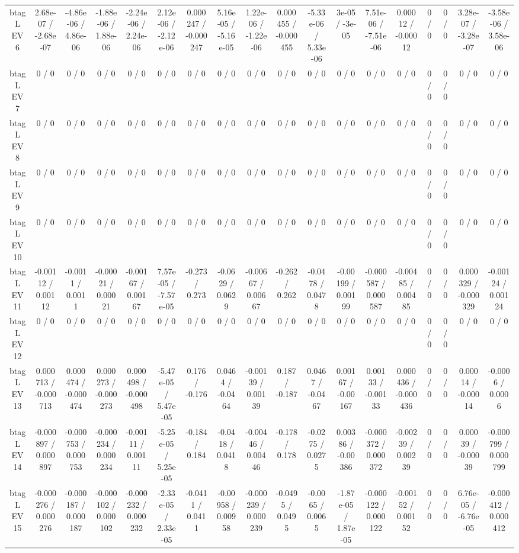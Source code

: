 \documentclass[10pt]{article}
\begin{document}
\begin{table}[htbp]
\begin{center}
\begin{tabular}{|c|c|c|c|c|c|c|c|c|c|c|c|c|c|c|c|c|c|}
  btag L EV 6 & 2.68e-07 / -2.68e-07 & -4.86e-06 / 4.86e-06 & -1.88e-06 / 1.88e-06 & -2.24e-06 / 2.24e-06 & 2.12e-06 / -2.12e-06 & 0.000247 / -0.000247 & 5.16e-05 / -5.16e-05 & 1.22e-06 / -1.22e-06 & 0.000455 / -0.000455 & -5.33e-06 / 5.33e-06 & 3e-05 / -3e-05 & 7.51e-06 / -7.51e-06 & 0.00012 / -0.00012 & 0 / 0 & 0 / 0 & 3.28e-07 / -3.28e-07 & -3.58e-06 / 3.58e-06 \\ 
  btag L EV 7 & 0 / 0 & 0 / 0 & 0 / 0 & 0 / 0 & 0 / 0 & 0 / 0 & 0 / 0 & 0 / 0 & 0 / 0 & 0 / 0 & 0 / 0 & 0 / 0 & 0 / 0 & 0 / 0 & 0 / 0 & 0 / 0 & 0 / 0 \\ 
  btag L EV 8 & 0 / 0 & 0 / 0 & 0 / 0 & 0 / 0 & 0 / 0 & 0 / 0 & 0 / 0 & 0 / 0 & 0 / 0 & 0 / 0 & 0 / 0 & 0 / 0 & 0 / 0 & 0 / 0 & 0 / 0 & 0 / 0 & 0 / 0 \\ 
  btag L EV 9 & 0 / 0 & 0 / 0 & 0 / 0 & 0 / 0 & 0 / 0 & 0 / 0 & 0 / 0 & 0 / 0 & 0 / 0 & 0 / 0 & 0 / 0 & 0 / 0 & 0 / 0 & 0 / 0 & 0 / 0 & 0 / 0 & 0 / 0 \\ 
  btag L EV 10 & 0 / 0 & 0 / 0 & 0 / 0 & 0 / 0 & 0 / 0 & 0 / 0 & 0 / 0 & 0 / 0 & 0 / 0 & 0 / 0 & 0 / 0 & 0 / 0 & 0 / 0 & 0 / 0 & 0 / 0 & 0 / 0 & 0 / 0 \\ 
  btag L EV 11 & -0.00112 / 0.00112 & -0.0011 / 0.0011 & -0.00021 / 0.00021 & -0.00167 / 0.00167 & 7.57e-05 / -7.57e-05 & -0.273 / 0.273 & -0.0629 / 0.0629 & -0.00667 / 0.00667 & -0.262 / 0.262 & -0.0478 / 0.0478 & -0.00199 / 0.00199 & -0.000587 / 0.000587 & -0.00485 / 0.00485 & 0 / 0 & 0 / 0 & 0.000329 / -0.000329 & -0.00124 / 0.00124 \\ 
  btag L EV 12 & 0 / 0 & 0 / 0 & 0 / 0 & 0 / 0 & 0 / 0 & 0 / 0 & 0 / 0 & 0 / 0 & 0 / 0 & 0 / 0 & 0 / 0 & 0 / 0 & 0 / 0 & 0 / 0 & 0 / 0 & 0 / 0 & 0 / 0 \\ 
  btag L EV 13 & 0.000713 / -0.000713 & 0.000474 / -0.000474 & 0.000273 / -0.000273 & 0.000498 / -0.000498 & -5.47e-05 / 5.47e-05 & 0.176 / -0.176 & 0.0464 / -0.0464 & -0.00139 / 0.00139 & 0.187 / -0.187 & 0.0467 / -0.0467 & 0.00167 / -0.00167 & 0.00133 / -0.00133 & 0.000436 / -0.000436 & 0 / 0 & 0 / 0 & 0.00014 / -0.00014 & -0.0006 / 0.0006 \\ 
  btag L EV 14 & -0.000897 / 0.000897 & -0.000753 / 0.000753 & -0.000234 / 0.000234 & -0.00111 / 0.00111 & -5.25e-05 / 5.25e-05 & -0.184 / 0.184 & -0.0418 / 0.0418 & -0.00446 / 0.00446 & -0.178 / 0.178 & -0.0275 / 0.0275 & 0.00386 / -0.00386 & -0.000372 / 0.000372 & -0.00239 / 0.00239 & 0 / 0 & 0 / 0 & 0.00039 / -0.00039 & -0.000799 / 0.000799 \\ 
  btag L EV 15 & -0.000276 / 0.000276 & -0.000187 / 0.000187 & -0.000102 / 0.000102 & -0.000232 / 0.000232 & -2.33e-05 / 2.33e-05 & -0.0411 / 0.0411 & -0.00958 / 0.00958 & -0.000239 / 0.000239 & -0.0495 / 0.0495 & -0.0065 / 0.0065 & -1.87e-05 / 1.87e-05 & -0.000122 / 0.000122 & -0.00152 / 0.00152 & 0 / 0 & 0 / 0 & 6.76e-05 / -6.76e-05 & -0.000412 / 0.000412 \\ 

\end{tabular}
\end{center}
\end{table}
\end{document}
